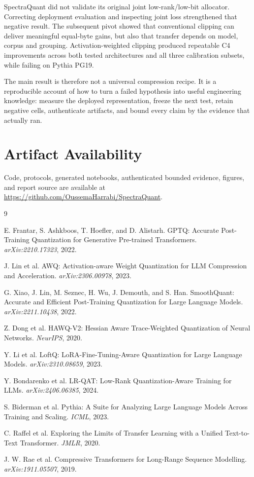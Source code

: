 \documentclass[10pt,twocolumn]{article}
\begin{document}
SpectraQuant did not validate its original joint low-rank/low-bit allocator.
Correcting deployment evaluation and inspecting joint loss strengthened that
negative result. The subsequent pivot showed that conventional clipping can
deliver meaningful equal-byte gains, but also that transfer depends on model,
corpus and grouping. Activation-weighted clipping produced repeatable C4
improvements across both tested architectures and all three calibration subsets,
while failing on Pythia PG19.

The main result is therefore not a universal compression recipe. It is a
reproducible account of how to turn a failed hypothesis into useful engineering
knowledge: measure the deployed representation, freeze the next test, retain
negative cells, authenticate artifacts, and bound every claim by the evidence
that actually ran.

\section*{Artifact Availability}

Code, protocols, generated notebooks, authenticated bounded evidence, figures,
and report source are available at
\url{https://github.com/OussemaHarrabi/SpectraQuant}.

\balance
\begin{thebibliography}{9}

E. Frantar, S. Ashkboos, T. Hoefler, and D. Alistarh.
\newblock GPTQ: Accurate Post-Training Quantization for Generative Pre-trained Transformers.
\newblock \emph{arXiv:2210.17323}, 2022.

J. Lin et al.
\newblock AWQ: Activation-aware Weight Quantization for LLM Compression and Acceleration.
\newblock \emph{arXiv:2306.00978}, 2023.

G. Xiao, J. Lin, M. Seznec, H. Wu, J. Demouth, and S. Han.
\newblock SmoothQuant: Accurate and Efficient Post-Training Quantization for Large Language Models.
\newblock \emph{arXiv:2211.10438}, 2022.

Z. Dong et al.
\newblock HAWQ-V2: Hessian Aware Trace-Weighted Quantization of Neural Networks.
\newblock \emph{NeurIPS}, 2020.

Y. Li et al.
\newblock LoftQ: LoRA-Fine-Tuning-Aware Quantization for Large Language Models.
\newblock \emph{arXiv:2310.08659}, 2023.

Y. Bondarenko et al.
\newblock LR-QAT: Low-Rank Quantization-Aware Training for LLMs.
\newblock \emph{arXiv:2406.06385}, 2024.

S. Biderman et al.
\newblock Pythia: A Suite for Analyzing Large Language Models Across Training and Scaling.
\newblock \emph{ICML}, 2023.

C. Raffel et al.
\newblock Exploring the Limits of Transfer Learning with a Unified Text-to-Text Transformer.
\newblock \emph{JMLR}, 2020.

J. W. Rae et al.
\newblock Compressive Transformers for Long-Range Sequence Modelling.
\newblock \emph{arXiv:1911.05507}, 2019.

\end{thebibliography}
\end{document}
